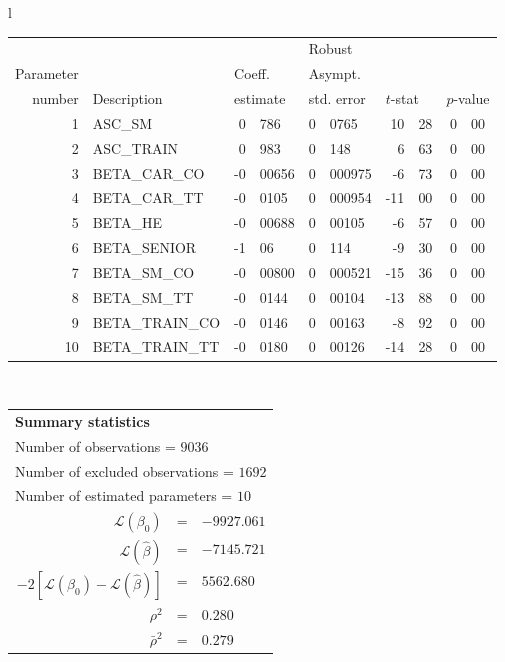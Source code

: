   \begin{tabular}{l}
\begin{tabular}{rlr@{.}lr@{.}lr@{.}lr@{.}l}
         &                       &   \multicolumn{2}{l}{}    & \multicolumn{2}{l}{Robust}  &     \multicolumn{4}{l}{}   \\
Parameter &                       &   \multicolumn{2}{l}{Coeff.}      & \multicolumn{2}{l}{Asympt.}  &     \multicolumn{4}{l}{}   \\
number &  Description                     &   \multicolumn{2}{l}{estimate}      & \multicolumn{2}{l}{std. error}  &   \multicolumn{2}{l}{$t$-stat}  &   \multicolumn{2}{l}{$p$-value}   \\

\hline

1 & ASC_SM & 0&786 & 0&0765 & 10&28 & 0&00\\
2 & ASC_TRAIN & 0&983 & 0&148 & 6&63 & 0&00\\
3 & BETA_CAR_CO & -0&00656 & 0&000975 & -6&73 & 0&00\\
4 & BETA_CAR_TT & -0&0105 & 0&000954 & -11&00 & 0&00\\
5 & BETA_HE & -0&00688 & 0&00105 & -6&57 & 0&00\\
6 & BETA_SENIOR & -1&06 & 0&114 & -9&30 & 0&00\\
7 & BETA_SM_CO & -0&00800 & 0&000521 & -15&36 & 0&00\\
8 & BETA_SM_TT & -0&0144 & 0&00104 & -13&88 & 0&00\\
9 & BETA_TRAIN_CO & -0&0146 & 0&00163 & -8&92 & 0&00\\
10 & BETA_TRAIN_TT & -0&0180 & 0&00126 & -14&28 & 0&00\\
\hline
\end{tabular}
\\
\begin{tabular}{rcl}
\multicolumn{3}{l}{\bf Summary statistics}\\
\multicolumn{3}{l}{ Number of observations = $9036$} \\
\multicolumn{3}{l}{ Number of excluded observations = $1692$} \\
\multicolumn{3}{l}{ Number of estimated  parameters = $10$} \\
 $\mathcal{L}(\beta_0)$ &=&  $-9927.061$ \\
 $\mathcal{L}(\hat{\beta})$ &=& $-7145.721 $  \\
 $-2[\mathcal{L}(\beta_0) -\mathcal{L}(\hat{\beta})]$ &=& $5562.680$ \\
    $\rho^2$ &=&   $0.280$ \\
    $\bar{\rho}^2$ &=&    $0.279$ \\
\end{tabular}
  \end{tabular}
